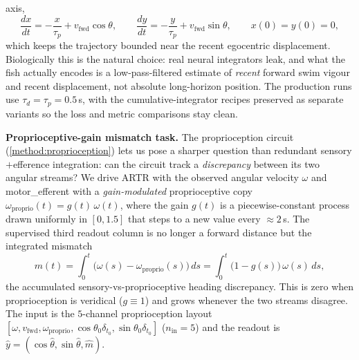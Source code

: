 \documentclass[11pt]{article}
\begin{document}
axis,
\begin{equation}
\frac{dx}{dt} = -\frac{x}{\tau_p} + v_{\mathrm{fwd}}\cos\theta,
\qquad
\frac{dy}{dt} = -\frac{y}{\tau_p} + v_{\mathrm{fwd}}\sin\theta,
\qquad x(0)=y(0)=0,
\label{eq:xy_pi}
\end{equation}
which keeps the trajectory bounded near the recent egocentric
displacement. Biologically this is the natural choice: real neural
integrators leak, and what the fish actually encodes is a
low-pass-filtered estimate of \emph{recent} forward swim vigour and
recent displacement, not absolute long-horizon position. The
production runs use $\tau_d=\tau_p=0.5\,$s, with the
cumulative-integrator recipes preserved as separate variants so the loss
and metric comparisons stay clean.

\bigskip
\noindent\textbf{Proprioceptive-gain mismatch task.}\label{method:mismatch}
The proprioception circuit (\cref{method:proprioception}) lets us pose a
sharper question than redundant sensory$+$efference integration: can the
circuit track a \emph{discrepancy} between its two angular streams? We
drive ARTR with the observed angular velocity $\omega$ and
motor\_efferent with a \emph{gain-modulated} proprioceptive copy
$\omega_{\mathrm{proprio}}(t) = g(t)\,\omega(t)$, where the gain $g(t)$
is a piecewise-constant process drawn uniformly in $[0,1.5]$ that steps
to a new value every ${\approx}2\,$s. The supervised third readout column is
no longer a forward distance but the integrated mismatch
\begin{equation}
m(t) = \int_0^t \big(\omega(s) - \omega_{\mathrm{proprio}}(s)\big)\,ds
     = \int_0^t \big(1 - g(s)\big)\,\omega(s)\,ds,
\label{eq:zhd_mismatch}
\end{equation}
the accumulated sensory-vs-proprioceptive heading discrepancy. This is zero
when proprioception is veridical ($g\equiv1$) and grows whenever the
two streams disagree. The input is the $5$-channel proprioception layout
$[\omega, v_{\mathrm{fwd}}, \omega_{\mathrm{proprio}},
\cos\theta_0\delta_{t_0}, \sin\theta_0\delta_{t_0}]$ ($n_{\mathrm{in}}=5$)
and the readout is $\hat y=(\cos\hat\theta,\sin\hat\theta,\hat m)$.
\end{document}
